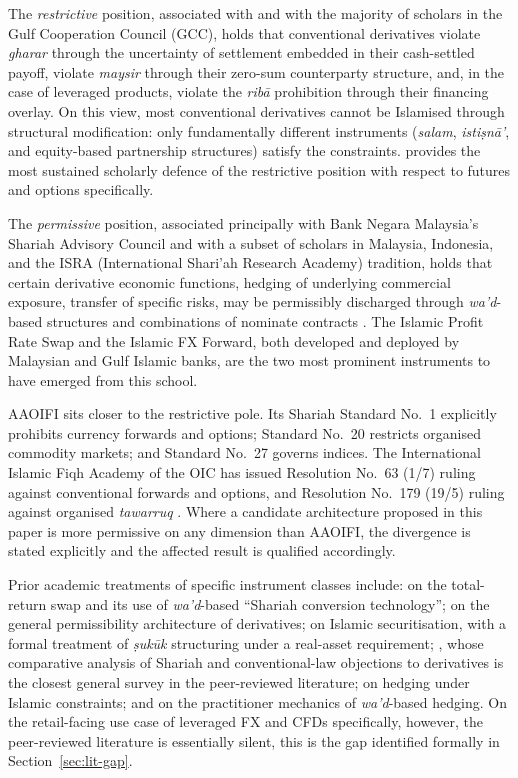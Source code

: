 \documentclass[preprint,12pt,authoryear]{elsarticle}
\theoremstyle{definition}
\begin{document}
The \emph{restrictive} position, associated with \citet{Usmani2002} and
with the majority of scholars in the Gulf Cooperation Council (GCC),
holds that conventional derivatives violate \emph{gharar} through the
uncertainty of settlement embedded in their cash-settled payoff,
violate \emph{maysir} through their zero-sum counterparty structure,
and, in the case of leveraged products, violate the
\emph{rib\={a}} prohibition through their financing overlay. On this
view, most conventional derivatives cannot be Islamised through
structural modification: only fundamentally different instruments
(\emph{salam}, \emph{isti\d{s}n\={a}'}, and equity-based partnership
structures) satisfy the constraints. \citet{Kamali2000} provides the
most sustained scholarly defence of the restrictive position with
respect to futures and options specifically.

The \emph{permissive} position, associated principally with Bank Negara
Malaysia's Shariah Advisory Council and with a subset of scholars in
Malaysia, Indonesia, and the ISRA (International Shari'ah Research
Academy) tradition, holds that certain derivative economic functions,
hedging of underlying commercial exposure, transfer of specific
risks, may be permissibly discharged through \emph{wa'd}-based
structures and combinations of nominate contracts
\citep{Bacha2013,Dusuki2011,ISRA2016}. The Islamic Profit Rate Swap and
the Islamic FX Forward, both developed and deployed by Malaysian and
Gulf Islamic banks, are the two most prominent instruments to have
emerged from this school.

AAOIFI sits closer to the restrictive pole. Its Shariah Standard No.~1
explicitly prohibits currency forwards and options; Standard No.~20
restricts organised commodity markets; and Standard No.~27 governs
indices. The International Islamic Fiqh Academy of the OIC has issued
Resolution No.~63 (1/7) ruling against conventional forwards and
options, and Resolution No.~179 (19/5) ruling against organised
\emph{tawarruq} \citep{OICFiqh63,OICFiqh179}. Where a candidate
architecture proposed in this paper is more permissive on any dimension
than AAOIFI, the divergence is stated explicitly and the affected
result is qualified accordingly.

Prior academic treatments of specific instrument classes include:
\citet{DeLorenzo2007} on the total-return swap and its use of
\emph{wa'd}-based ``Shariah conversion technology'';
\citet{Bacha1999} on the general permissibility architecture of
derivatives; \citet{Jobst2007} on Islamic securitisation, with a formal
treatment of \emph{\d{s}uk\={u}k} structuring under a real-asset
requirement; \citet{Kunhibava2010}, whose comparative analysis of
Shariah and conventional-law objections to derivatives is the closest
general survey in the peer-reviewed literature; \citet{AlSuwailem2006}
on hedging under Islamic constraints; and \citet{Uberoi2008} on the
practitioner mechanics of \emph{wa'd}-based hedging. On the
retail-facing use case of leveraged FX and CFDs specifically, however,
the peer-reviewed literature is essentially silent, this is the
gap identified formally in Section~\ref{sec:lit-gap}.
\end{document}
